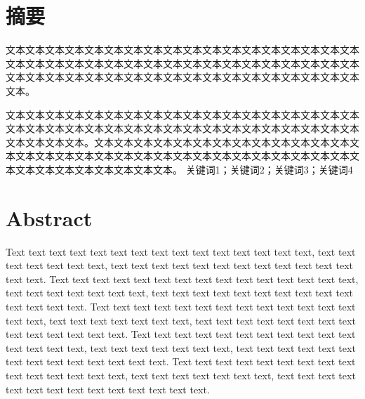 \documentclass[
	StudentName     = ,
	StudentNameEng	= {{Name of Graduate (such as HAN Bao-cheng)}},
	AdvisorName     = {{姓名 职称}},
        AdvisorNameOut     = {{姓名 职称}},
	AdvisorNameEng	= {{Name of Supervisor and Title (such as Prof. FENG Chang-gen)}},
        AdvisorNameEngOut = {{Name of Second Supervisor and Title}},
	StudentID		= xxxxx,
	Major           = {{电子信息硕士}},
	ResearchInterest= {{计算机技术}},
	Department		= XXXX学院,
	DepartmentEng	= {{Name of Department (or School)}},
	SubmitYear		= 202X,
	SubmitMonth		= X,
	SubmitDay		= XX,
	DefenseYear		= 202X,
	DefenseMonth	= X,
	DefenseDay		= XX,
	DefenseDateEng  = {{Date of Submit (such as April 2002)}},
	Title           = {{基于深度强化学习的多无人机协同控制研究}},
	TitleEng        = {{English Title}},
	CLCNumber		= TD235,
	UDCNumber		= 624.152.5
]{cauc_thesis}
\newcommand{\inputpage}[1]{
	
}
\begin{document}
\inputpage{cover}

\newpage
\setlength{\headsep}{1.224cm}
{\centering\chapter*{\heiti 摘\quad\quad 要}}
\thispagestyle{fancy}
\setcounter{page}{1}



\setlength{\baselineskip}{20pt}
    文本文本文本文本文本文本文本文本文本文本文本文本文本文本文本文本文本文本文本文本文本文本文本文本文本文本文本文本文本文本文本文本文本文本文本文本文本文本文本文本文本文本文本文本文本文本文本文本文本文本文本文本文本文本文本。
 
    文本文本文本文本文本文本文本文本文本文本文本文本文本文本文本文本文本文本文本文本文本文本文本文本文本文本文本文本文本文本文本文本文本文本文本文本文本文本文本文本。文本文本文本文本文本文本文本文本文本文本文本文本文本文本文本文本文本文本文本文本文本文本文本文本文本文本文本文本文本文本文本文本文本文本文本文本文本文本文本文本。
\newline
{} 关键词1；关键词2；关键词3；关键词4

\newpage
\setlength{\headsep}{1.224cm}
{\centering\chapter*{\textbf{Abstract}}}
\thispagestyle{fancy}
    Text text text text text text text text text text text text text text text, text text text text text text text, text text text text text text text text text text text text text text. Text text text text text text text text text text text text text text text, text text text text text text text, text text text text text text text text text text text text text text. Text text text text text text text text text text text text text text text, text text text text text text text, text text text text text text text text text text text text text text. Text text text text text text text text text text text text text text text, text text text text text text text, text text text text text text text text text text text text text text. Text text text text text text text text text text text text text text text, text text text text text text text, text text text text text text text text text text text text text text.
\end{document}
